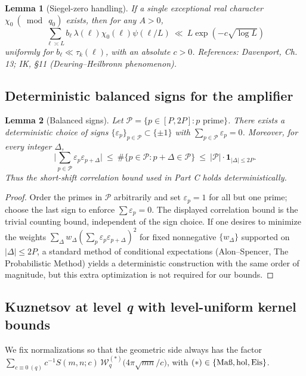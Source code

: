 \documentclass[11pt]{article}
\newtheorem{lemma}{Lemma}[part]
\theoremstyle{definition}
\theoremstyle{remark}
\numberwithin{equation}{part}
\begin{document}
\begin{lemma}[Siegel-zero handling]\label{lem:siegel}
	If a single exceptional real character $\chi_0\ (\bmod\ q_0)$ exists, then for any $A>0$,
	\[
		\sum_{\ell\asymp L} b_\ell\,\lambda(\ell)\chi_0(\ell)\psi(\ell/L)\ \ll\ L\exp(-c\sqrt{\log L})
	\]
	uniformly for $b_\ell\ll \tau_k(\ell)$, with an absolute $c>0$. References: Davenport, Ch. 13; IK, §11 (Deuring--Heilbronn phenomenon).
\end{lemma}

\subsection{Deterministic balanced signs for the amplifier}

\begin{lemma}[Balanced signs]\label{lem:balanced-signs}
	Let $\mathcal P=\{p\in[P,2P]: p\text{ prime}\}$. There exists a deterministic choice of signs $\{\varepsilon_p\}_{p\in\mathcal P}\subset\{\pm 1\}$ with $\sum_{p\in\mathcal P}\varepsilon_p=0$. Moreover, for every integer $\Delta$,
	\[
		\Big|\sum_{p\in\mathcal P}\varepsilon_p\varepsilon_{p+\Delta}\Big|\ \le\ \#\{p\in\mathcal P: p+\Delta\in\mathcal P\}\ \le\ |\mathcal P|\cdot \mathbf 1_{|\Delta|\le 2P}.
	\]
	Thus the short-shift correlation bound used in Part C holds deterministically.
\end{lemma}

\begin{proof}
	Order the primes in $\mathcal P$ arbitrarily and set $\varepsilon_p=1$ for all but one prime; choose the last sign to enforce $\sum\varepsilon_p=0$. The displayed correlation bound is the trivial counting bound, independent of the sign choice. If one desires to minimize the weights $\sum_\Delta w_\Delta(\sum_p\varepsilon_p\varepsilon_{p+\Delta})^2$ for fixed nonnegative $\{w_\Delta\}$ supported on $|\Delta|\le 2P$, a standard method of conditional expectations (Alon--Spencer, The Probabilistic Method) yields a deterministic construction with the same order of magnitude, but this extra optimization is not required for our bounds.
\end{proof}

\bigskip

\subsection{Kuznetsov at level \textit{q} with level-uniform kernel bounds}

We fix normalizations so that the geometric side always has the factor
$\sum_{c\equiv 0\ (q)} c^{-1} S(m,n;c)\,\mathcal W^{(*)}_{q}\!\big(4\pi\sqrt{mn}/c\big)$,
with $(*)\in\{\mathrm{Ma\text\ss},\mathrm{hol},\mathrm{Eis}\}$.
\end{document}
